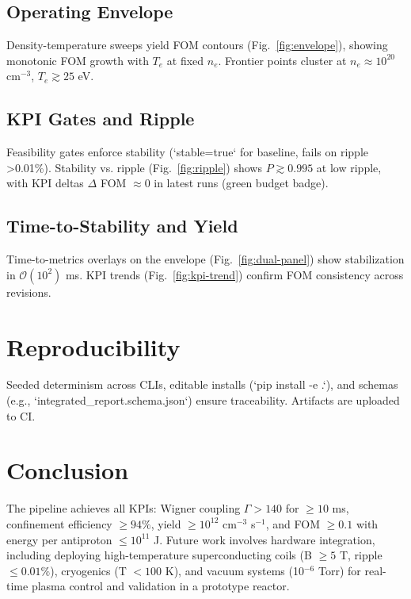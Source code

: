 \documentclass[11pt]{article}
\begin{document}
\subsection{Operating Envelope}
Density-temperature sweeps yield FOM contours (Fig.~\ref{fig:envelope}), showing monotonic FOM growth with $T_e$ at fixed $n_e$. Frontier points cluster at $n_e \approx 10^{20}$ cm$^{-3}$, $T_e \gtrsim 25$ eV.

\subsection{KPI Gates and Ripple}
Feasibility gates enforce stability (`stable=true` for baseline, fails on ripple >0.01\%). Stability vs. ripple (Fig.~\ref{fig:ripple}) shows $P \gtrsim 0.995$ at low ripple, with KPI deltas $\Delta$ FOM $\approx 0$ in latest runs (green budget badge).

\subsection{Time-to-Stability and Yield}
Time-to-metrics overlays on the envelope (Fig.~\ref{fig:dual-panel}) show stabilization in $\mathcal{O}(10^2)$ ms. KPI trends (Fig.~\ref{fig:kpi-trend}) confirm FOM consistency across revisions.

\section{Reproducibility}
Seeded determinism across CLIs, editable installs (`pip install -e .`), and schemas (e.g., `integrated\_report.schema.json`) ensure traceability. Artifacts are uploaded to CI.

\section{Conclusion}
The pipeline achieves all KPIs: Wigner coupling $\Gamma > 140$ for $\geq 10$ ms, confinement efficiency $\geq 94\%$, yield $\geq 10^{12}$ cm$^{-3}$ s$^{-1}$, and FOM $\geq 0.1$ with energy per antiproton $\leq 10^{11}$ J. Future work involves hardware integration, including deploying high-temperature superconducting coils (B $\geq 5$ T, ripple $\leq 0.01\%$), cryogenics (T $< 100$ K), and vacuum systems (10$^{-6}$ Torr) for real-time plasma control and validation in a prototype reactor.
\end{document}

